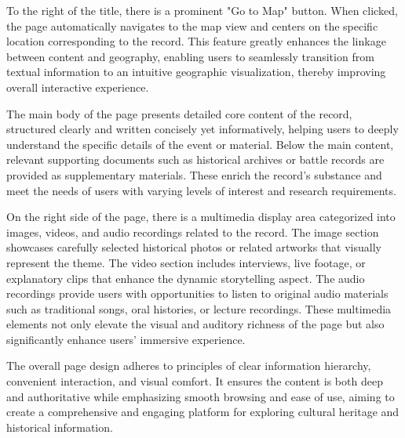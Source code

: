 To the right of the title, there is a prominent "Go to Map" button. When clicked, the page automatically navigates to the map view and centers on the specific location corresponding to the record. This feature greatly enhances the linkage between content and geography, enabling users to seamlessly transition from textual information to an intuitive geographic visualization, thereby improving overall interactive experience.

The main body of the page presents detailed core content of the record, structured clearly and written concisely yet informatively, helping users to deeply understand the specific details of the event or material. Below the main content, relevant supporting documents such as historical archives or battle records are provided as supplementary materials. These enrich the record's substance and meet the needs of users with varying levels of interest and research requirements.

On the right side of the page, there is a multimedia display area categorized into images, videos, and audio recordings related to the record. The image section showcases carefully selected historical photos or related artworks that visually represent the theme. The video section includes interviews, live footage, or explanatory clips that enhance the dynamic storytelling aspect. The audio recordings provide users with opportunities to listen to original audio materials such as traditional songs, oral histories, or lecture recordings. These multimedia elements not only elevate the visual and auditory richness of the page but also significantly enhance users' immersive experience.

The overall page design adheres to principles of clear information hierarchy, convenient interaction, and visual comfort. It ensures the content is both deep and authoritative while emphasizing smooth browsing and ease of use, aiming to create a comprehensive and engaging platform for exploring cultural heritage and historical information.


